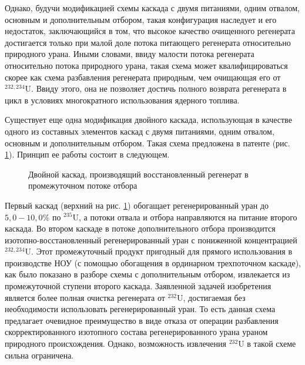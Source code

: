 Однако, будучи модификацией схемы каскада с двумя питаниями, одним отвалом, основным и дополнительным отбором, такая конфигурация наследует и его недостаток, заключающийся в том, что высокое качество очищенного регенерата достигается только при малой доле потока питающего регенерата относительно природного урана. Иными словами, ввиду малости потока регенерата относительно потока природного урана, такая схема может квалифицироваться скорее как схема разбавления регенерата природным, чем очищающая его от $^{232,234}$U. Ввиду этого, она не позволяет достичь полного возврата регенерата в цикл в условиях многократного использования ядерного топлива.


Существует еще одна модификация двойного каскада, использующая в качестве одного из составных элементов каскад с двумя питаниями, одним отвалом, основным и дополнительным отбором. Такая схема предложена в патенте \cite{SposobIzotopnogoVosstanovleniyac} (рис. \ref{fig:double_crazy}). Принцип ее работы состоит в следующем.

\begin{figure}[ht]
  \caption{Двойной каскад, производящий восстановленный регенерат в промежуточном потоке отбора}\label{fig:double_crazy}
\end{figure}

Первый каскад (верхний на рис. \ref{fig:double_crazy}) обогащает регенерированный уран до $5,0-10,0$\% по $^{235}$U, а потоки отвала и отбора направляются на питание второго каскада. Во втором каскаде в потоке дополнительного отбора производится изотопно-восстановленный регенерированный уран с пониженной концентрацией $^{232,234}$U. Этот промежуточный продукт пригодный для прямого использования в производстве НОУ (с помощью обогащения в ординарном трехпоточном каскаде), как было показано в разборе схемы с дополнительным отбором, извлекается из промежуточной ступени второго каскада. Заявленной задачей изобретения является более полная очистка регенерата от $^{232}$U, достигаемая без необходимости использовать регенерированный уран. То есть данная схема предлагает очевидное преимущество в виде отказа от операции разбавления скорректированного изотопного состава регенерированного урана ураном природного происхождения. Однако, возможность извлечения $^{232}$U в такой схеме сильна ограничена.

